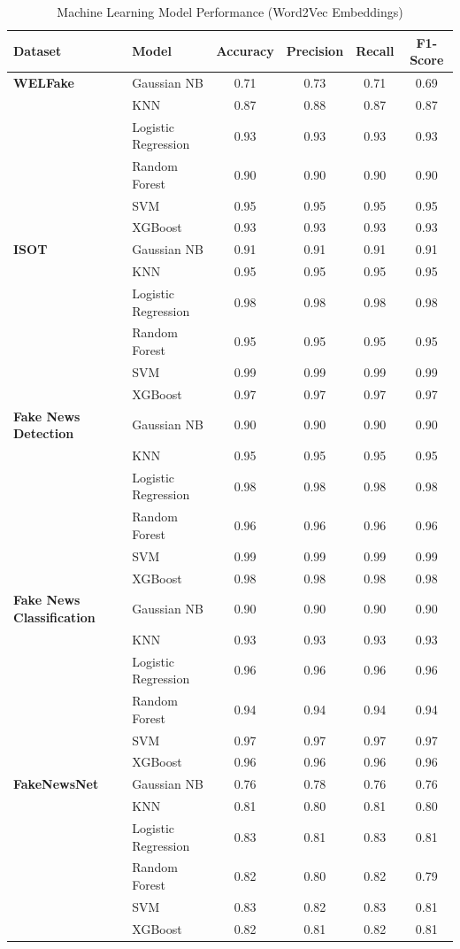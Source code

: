 \documentclass[stu,12pt,floatsintext,donotrepeattitle]{apa7}
\begin{document}
\begin{table}[H]
\centering
\small
\caption{Machine Learning Model Performance (Word2Vec Embeddings)}
\label{tab:word2vec_ml}
\begin{tabular}{llcccc}
\toprule
\textbf{Dataset} & \textbf{Model} & \textbf{Accuracy} & \textbf{Precision} & \textbf{Recall} & \textbf{F1-Score} \\
\midrule
\textbf{WELFake} & Gaussian NB & 0.71 & 0.73 & 0.71 & 0.69 \\
 & KNN & 0.87 & 0.88 & 0.87 & 0.87 \\
 & Logistic Regression & 0.93 & 0.93 & 0.93 & 0.93 \\
 & Random Forest & 0.90 & 0.90 & 0.90 & 0.90 \\
 & SVM & 0.95 & 0.95 & 0.95 & 0.95 \\
 & XGBoost & 0.93 & 0.93 & 0.93 & 0.93 \\
\midrule
\textbf{ISOT} & Gaussian NB & 0.91 & 0.91 & 0.91 & 0.91 \\
 & KNN & 0.95 & 0.95 & 0.95 & 0.95 \\
 & Logistic Regression & 0.98 & 0.98 & 0.98 & 0.98 \\
 & Random Forest & 0.95 & 0.95 & 0.95 & 0.95 \\
 & SVM & 0.99 & 0.99 & 0.99 & 0.99 \\
 & XGBoost & 0.97 & 0.97 & 0.97 & 0.97 \\
\midrule
\textbf{Fake News Detection} & Gaussian NB & 0.90 & 0.90 & 0.90 & 0.90 \\
 & KNN & 0.95 & 0.95 & 0.95 & 0.95 \\
 & Logistic Regression & 0.98 & 0.98 & 0.98 & 0.98 \\
 & Random Forest & 0.96 & 0.96 & 0.96 & 0.96 \\
 & SVM & 0.99 & 0.99 & 0.99 & 0.99 \\
 & XGBoost & 0.98 & 0.98 & 0.98 & 0.98 \\
\midrule
\textbf{Fake News Classification} & Gaussian NB & 0.90 & 0.90 & 0.90 & 0.90 \\
 & KNN & 0.93 & 0.93 & 0.93 & 0.93 \\
 & Logistic Regression & 0.96 & 0.96 & 0.96 & 0.96 \\
 & Random Forest & 0.94 & 0.94 & 0.94 & 0.94 \\
 & SVM & 0.97 & 0.97 & 0.97 & 0.97 \\
 & XGBoost & 0.96 & 0.96 & 0.96 & 0.96 \\
\midrule
\textbf{FakeNewsNet} & Gaussian NB & 0.76 & 0.78 & 0.76 & 0.76 \\
 & KNN & 0.81 & 0.80 & 0.81 & 0.80 \\
 & Logistic Regression & 0.83 & 0.81 & 0.83 & 0.81 \\
 & Random Forest & 0.82 & 0.80 & 0.82 & 0.79 \\
 & SVM & 0.83 & 0.82 & 0.83 & 0.81 \\
 & XGBoost & 0.82 & 0.81 & 0.82 & 0.81 \\
\bottomrule
\end{tabular}
\end{table}
\end{document}
